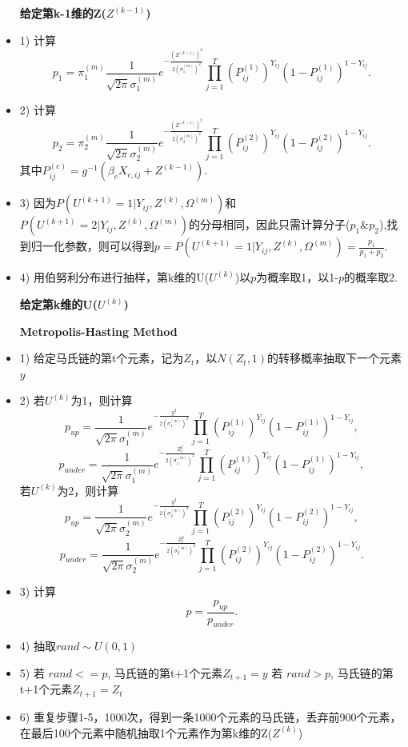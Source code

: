 \documentclass[11pt]{article}
\begin{document}
\begin{itemize}
  \centerline{\textbf{给定第k-1维的Z($Z^{(k-1)}$)}}
  
  \item 1) 计算$$p_1=\pi_1^{(m)}\frac{1}{\sqrt{2\pi}\sigma_1^{(m)}}e^{-\frac{(Z^{(k-1)})^2}{2(\sigma_1^{(m)})^2}}\prod_{j=1}^{T}(P^{(1)}_{ij})^{Y_{ij}}(1-P^{(1)}_{ij})^{1-Y_{ij}}.$$ 
  \item 2) 计算$$p_2=\pi_2^{(m)}\frac{1}{\sqrt{2\pi}\sigma_2^{(m)}}e^{-\frac{(Z^{(k-1)})^2}{2(\sigma_2^{(m)})^2}}\prod_{j=1}^{T}(P^{(2)}_{ij})^{Y_{ij}}(1-P^{(2)}_{ij})^{1-Y_{ij}}.$$ 其中$P^{(c)}_{ij}=g^{-1}(\beta_c X_{c,ij} + Z^{(k-1)})$. 
  \item 3) 因为$P(U^{(k+1)}=1|Y_{ij},Z^{(k)},\Omega^{(m)})$和$P(U^{(k+1)}=2|Y_{ij},Z^{(k)},\Omega^{(m)})$的分母相同，因此只需计算分子($p_1 \& p_2$),找到归一化参数，则可以得到$p = P(U^{(k+1)}=1|Y_{ij},Z^{(k)},\Omega^{(m)})=\frac{p_1}{p_1+p_2}$.
  \item 4) 用伯努利分布进行抽样，第k维的U($U^{(k)}$)以$p$为概率取1，以1-$p$的概率取2.
  \par
  \centerline{\textbf{给定第k维的U($U^{(k)}$)}}
  \centerline{\textbf{Metropolis-Hasting Method}}
  \item 1) 给定马氏链的第t个元素，记为$Z_t$，以$N(Z_t,1)$的转移概率抽取下一个元素$y$
  \item 2) 
  \subitem 若$U^{(k)}$为1，则计算$$p_{up}=\frac{1}{\sqrt{2\pi}\sigma_1^{(m)}}e^{-\frac{y^2}{2(\sigma_1^{(m)})^2}}\prod_{j=1}^{T}(P^{(1)}_{ij})^{Y_{ij}}(1-P^{(1)}_{ij})^{1-Y_{ij}},$$ $$p_{under}=\frac{1}{\sqrt{2\pi}\sigma_1^{(m)}}e^{-\frac{Z_t^2}{2(\sigma_1^{(m)})^2}}\prod_{j=1}^{T}(P^{(1)}_{ij})^{Y_{ij}}(1-P^{(1)}_{ij})^{1-Y_{ij}},$$ 
  \subitem 若$U^{(k)}$为2，则计算$$p_{up}=\frac{1}{\sqrt{2\pi}\sigma_2^{(m)}}e^{-\frac{y^2}{2(\sigma_2^{(m)})^2}}\prod_{j=1}^{T}(P^{(2)}_{ij})^{Y_{ij}}(1-P^{(2)}_{ij})^{1-Y_{ij}},$$ $$p_{under}=\frac{1}{\sqrt{2\pi}\sigma_2^{(m)}}e^{-\frac{Z_t^2}{2(\sigma_2^{(m)})^2}}\prod_{j=1}^{T}(P^{(2)}_{ij})^{Y_{ij}}(1-P^{(2)}_{ij})^{1-Y_{ij}}.$$ 
  \item 3) 计算 $$p=\frac{p_{up}}{p_{under}}.$$
  \item 4) 抽取$rand\sim U(0,1)$
  \item 5) 
  \subitem 若 $rand <= p$, 马氏链的第t+1个元素$Z_{t+1}=y$
  \subitem 若 $rand > p $, 马氏链的第t+1个元素$Z_{t+1}=Z_t$
  \item 6) 重复步骤1-5，1000次，得到一条1000个元素的马氏链，丢弃前900个元素，在最后100个元素中随机抽取1个元素作为第k维的Z($Z^{(k)}$)

\end{itemize}
\end{document}
